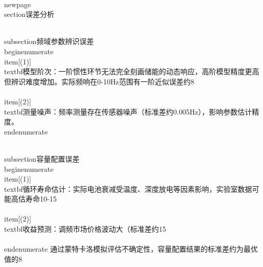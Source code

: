 \\newpage
\\section{误差分析}

\\subsection{频域参数辨识误差}
\\begin{enumerate}
    \\item[(1)] \\textbf{模型阶次}：一阶惯性环节无法完全刻画储能的动态响应，高阶模型精度更高但辨识难度增加。实际频响在0-10Hz范围有一阶近似误差约8\\%
    \\item[(2)] \\textbf{测量噪声}：频率测量存在传感器噪声（标准差约0.005Hz），影响参数估计精度。
\\end{enumerate}

\\subsection{容量配置误差}
\\begin{enumerate}
    \\item[(1)] \\textbf{循环寿命估计}：实际电池衰减受温度、深度放电等因素影响，实验室数据可能高估寿命10-15\\%
    \\item[(2)] \\textbf{收益预测}：调频市场价格波动大（标准差约15\\%
\\end{enumerate}
通过蒙特卡洛模拟评估不确定性，容量配置结果的标准差约为最优值的8\\%
